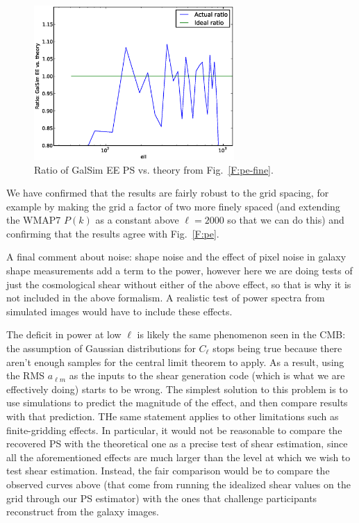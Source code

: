 \documentclass[preprint]{aastex}
\begin{document}
\begin{figure}
\begin{center}
\includegraphics[width=3in]{../external/test_gridshear/output/compare_input_pe.fine.ratio.eps}
\caption{Ratio of GalSim EE PS vs. theory from Fig.~\ref{F:pe-fine}.\label{F:pe-fine-ratio}}
\end{center}
\end{figure}

We have confirmed that the results are fairly robust to the grid
spacing, for example by making the grid a factor of two more finely
spaced (and extending the WMAP7 $P(k)$ as a constant above $\ell=2000$
so that we can do this) and confirming that the results agree with
Fig.~\ref{F:pe}.

A final comment about noise: shape noise and the effect of pixel noise
in galaxy shape measurements add a term to the power, however here we
are doing tests of just the cosmological shear without either of the
above effect, so that is why it is not included in the above
formalism.  A realistic test of power spectra from simulated images
would have to include these effects.

The deficit in power at low $\ell$ is likely the same phenomenon  seen
in the CMB: the assumption of Gaussian distributions for $C_\ell$
stops being true because there aren't enough samples for the central
limit theorem to apply.  As a result, using the RMS $a_{\ell m}$ as
the inputs to the shear generation code (which is what we are
effectively doing) starts to be wrong.  The simplest solution to this
problem is to use simulations to predict the magnitude of the effect,
and then compare results with that prediction.  THe same statement
applies to other limitations such as finite-gridding effects.  In
particular, it would not be reasonable to compare the recovered PS
with the theoretical one as a precise test of shear estimation, since
all the aforementioned effects are much larger than the level at which
we wish to test shear estimation.  Instead, the fair comparison would
be to compare the observed curves above (that come from running the
idealized shear values on the grid through our PS estimator) with the
ones that challenge participants reconstruct from the galaxy images.
\end{document}
